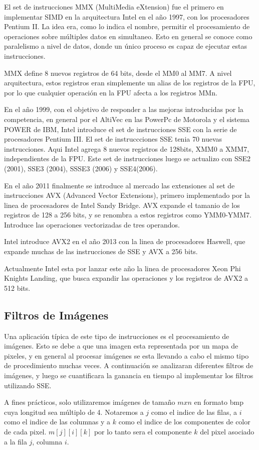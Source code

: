 El set de instrucciones MMX (MultiMedia eXtension) fue el primero en implementar SIMD en la arquitectura Intel en el año 1997, con los procesadores Pentium II. La idea era, como lo indica el nombre, permitir el procesamiento de operaciones sobre múltiples datos en simultaneo. Esto en general se conoce como paralelismo a nivel de datos, donde un único proceso es capaz de ejecutar estas instrucciones.

MMX define 8 nuevos registros de 64 bits, desde el MM0 al MM7. A nivel arquitectura, estos registros eran simplemente un alias de los registros de la FPU, por lo que cualquier operación en la FPU afecta a los registros MMn.

En el año 1999, con el objetivo de responder a las mejoras introducidas por la competencia, en general por el AltiVec en las PowerPc de Motorola y el sistema POWER de IBM, Intel introduce el set de instrucciones SSE con la serie de procesadores Pentium III. El set de instruccciones SSE tenia 70 nuevas instrucciones. Aqui Intel agrega 8 nuevos registros de 128bits, XMM0 a XMM7, independientes de la FPU. Este set de instrucciones luego se actualizo con SSE2 (2001), SSE3 (2004), SSSE3 (2006) y SSE4(2006).

En el año 2011 finalmente se introduce al mercado las extensiones al set de instrucciones AVX (Advanced Vector Extensions), primero implementado por la linea de procesadores de Intel Sandy Bridge. AVX expande el tamanio de los registros de 128 a 256 bits, y se renombra a estos registros como YMM0-YMM7. Introduce las operaciones vectorizadas de tres operandos. 

Intel introduce AVX2 en el año 2013 con la linea de procesadores Haswell, que expande muchas de las instrucciones de SSE y AVX a 256 bits.

Actualmente Intel esta por lanzar este año la linea de procesadores Xeon Phi Knights Landing, que busca expandir las operaciones y los registros de AVX2 a 512 bits.

\subsection{Filtros de Imágenes}
Una aplicación típica de este tipo de instrucciones es el procesamiento de imágenes. Esto se debe a que una imagen esta representada por un mapa de pixeles, y en general al procesar imágenes se esta llevando a cabo el mismo tipo de procedimiento muchas veces. A continuación se analizaran diferentes filtros de imágenes, y luego se cuantificara la ganancia en tiempo al implementar los filtros utilizando SSE.

A fines prácticos, solo utilizaremos imágenes de tamaño $mxn$ en formato bmp cuya longitud sea múltiplo de 4. Notaremos a $j$ como el indice de las filas, a $i$ como el indice de las columnas y a $k$ como el indice de los componentes de color de cada pixel. $m[j][i][k]$ por lo tanto sera el componente $k$ del pixel asociado a la fila $j$, columna $i$.
